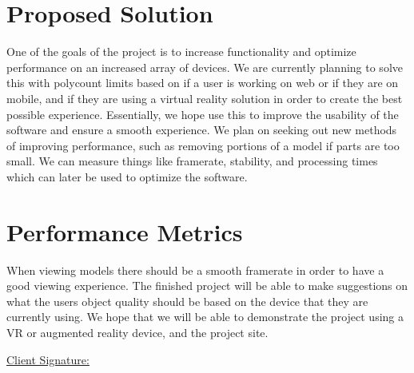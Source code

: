 \documentclass[letterpaper,10pt,draftclsnofoot,onecolumn, titlepage]{IEEEtran}
\begin{document}
\section{Proposed Solution}
{One of the goals of the project is to increase functionality and optimize performance on an increased array of devices. We are currently planning to solve this with polycount limits based on if a user is working on web or if they are on mobile, and if they are using a virtual reality solution in order to create the best possible experience. Essentially, we hope use this to improve the usability of the software and ensure a smooth experience. We plan on seeking out new methods of improving performance, such as removing portions of a model if parts are too small. We can measure things like framerate, stability, and processing times which can later be used to optimize the software.\par}
\section{Performance Metrics}
{When viewing models there should be a smooth framerate in order to have a good viewing experience. The finished project will be able to make suggestions on what the users object quality should be based on the device that they are currently using. We hope that we will be able to demonstrate the project using a VR or augmented reality device, and the project site. \par}

\vfill
\begin{Form}
	\underline{Client Signature:}
\end{Form}
%
%
\end{document}
